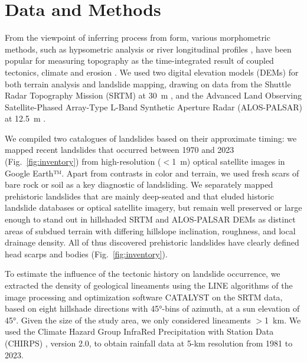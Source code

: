 \documentclass[draft]{agujournal2019}
\begin{document}

\section{Data and Methods}
\par From the viewpoint of inferring process from form, various morphometric methods, such as hypsometric analysis \cite{Strahler1952} or river longitudinal profiles \cite{Wobus2006}, have been popular for measuring topography as the time-integrated result of coupled tectonics, climate and erosion \cite{Whittaker2012, Perron2013, Willett2014}. We used two digital elevation models (DEMs) for both terrain analysis and landslide mapping, drawing on data from the Shuttle Radar Topography Mission (SRTM) at 30~m \cite{farr2007}, and the Advanced Land Observing Satellite-Phased Array-Type L-Band Synthetic Aperture Radar (ALOS-PALSAR) at 12.5~m \cite{logan2014}. 

\par We compiled two catalogues of landslides based on their approximate timing: we mapped recent landslides that occurred between 1970 and 2023 (Fig.~\ref{fig:inventory}) from high-resolution ($<$1~m) optical satellite images in Google Earth™. Apart from contrasts in color and terrain, we used fresh scars of bare rock or soil as a key diagnostic of landsliding. We separately mapped prehistoric landslides that are mainly deep-seated and that eluded historic landslide databases or optical satellite imagery, but remain well preserved or large enough to stand out in hillshaded SRTM and ALOS-PALSAR DEMs as distinct areas of subdued terrain with differing hillslope inclination, roughness, and local drainage density. All of thus discovered prehistoric landslides have clearly defined head scarps and bodies (Fig.~\ref{fig:inventory}).

\par To estimate the influence of the tectonic history on landslide occurrence, we extracted the density of geological lineaments using the LINE algorithms of the image processing and optimization software CATALYST on the SRTM data, based on eight hillshade directions with 45°-bins of azimuth, at a sun elevation of 45°. Given the size of the study area, we only considered lineaments $>$1~km. We used the Climate Hazard Group InfraRed Precipitation with Station Data (CHIRPS) \cite{funk2015}, version 2.0, to obtain rainfall data at 5-km resolution from 1981 to 2023.
\end{document}
